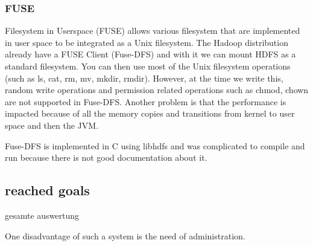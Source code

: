 \subsubsection{FUSE}

Filesystem in Userspace (FUSE) allows various filesystem that are implemented in user space to be integrated as a Unix filesystem. The Hadoop distribution already have a FUSE Client (Fuse-DFS) and with it we can mount HDFS as a standard filesystem. You can then use most of the Unix filesystem operations (such as ls, cat, rm, mv, mkdir, rmdir). However, at the time we write this, random write operations and permission related operations such as chmod, chown are not supported in Fuse-DFS. Another problem is that the performance is impacted because of all the memory copies and transitions from kernel to user space and then the JVM.

Fuse-DFS is implemented in C using libhdfs and was complicated to compile and run because there is not good documentation about it.

\subsection{reached goals}

gesamte auswertung


One disadvantage of such a system is the need of administration.


